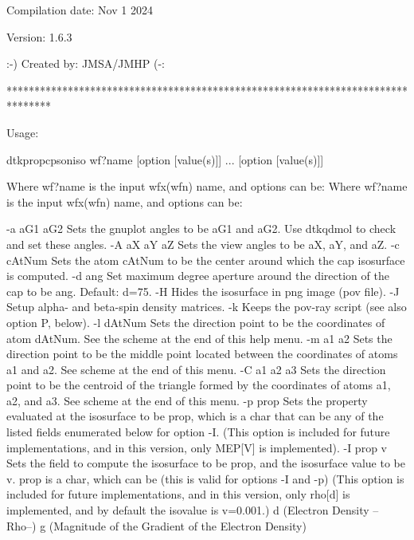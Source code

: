                          Compilation date: Nov  1 2024

                                 Version: 1.6.3

                         :-) Created by: JMSA/JMHP (-:

********************************************************************************


Usage:

	dtkpropcpsoniso wf?name [option [value(s)]] ... [option [value(s)]]

Where wf?name is the input wfx(wfn) name, and options can be:
Where wf?name is the input wfx(wfn) name, and options can be:

  -a aG1 aG2	Sets the gnuplot angles to be aG1 and aG2.
            	  Use dtkqdmol to check and set these angles.
  -A aX aY aZ	Sets the view angles to be aX, aY, and aZ.
  -c cAtNum 	Sets the atom cAtNum to be the center around which the
            	  cap isosurface is computed.
  -d ang    	Set maximum degree aperture around the direction of the cap
            	  to be ang. Default: d=75.
  -H        	Hides the isosurface in png image (pov file).
  -J        	Setup alpha- and beta-spin density matrices.
  -k        	Keeps the pov-ray script (see also option P, below).
  -l dAtNum 	Sets the direction point to be the coordinates of atom
            	  dAtNum. See the scheme at the end of this help menu.
  -m a1 a2  	Sets the direction point to be the middle point located
            	  between the coordinates of atoms a1 and a2.
            	  See scheme at the end of this menu.
  -C a1 a2 a3	Sets the direction point to be the centroid of the
            	  triangle formed by the coordinates of atoms
            	  a1, a2, and a3.
            	  See scheme at the end of this menu.
  -p prop   	Sets the property evaluated at the isosurface to be
            	  prop, which is a char that can be any of the listed
            	  fields enumerated below for option -I.
            	  (This option is included for future implementations,
            	  and in this version, only MEP[V] is implemented).
  -I prop v 	Sets the field to compute the isosurface to be prop,
            	  and the isosurface value to be v. prop is a char,
            	  which can be (this is valid for options -I and -p)
            	  (This option is included for future implementations,
            	  and in this version, only rho[d] is implemented,
            	  and by default the isovalue is v=0.001.)
         		d (Electron Density --Rho--)
         		g (Magnitude of the Gradient of the Electron Density)

